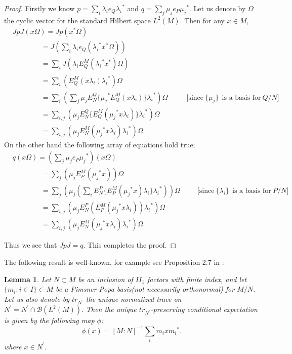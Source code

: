 \documentclass[11pt,letterpaper]{amsart}
\newtheorem{lemma}[theorem]{Lemma}
\theoremstyle{definition}
\theoremstyle{remark}
\begin{document}
 \begin{proof}
 Firstly we know $p=\sum_i{\lambda}_ie_Q{{\lambda}_i}^*$ and $q=\sum_j{\mu}_je_P{{\mu}_j}^*.$ Let us denote by $\Omega$ the cyclic vector for  the standard Hilbert space $L^2(M).$ Then for any $x\in M$,
 \begin{align*}
  & JpJ(x\Omega)= Jp(x^*\Omega)\\
  & \qquad \qquad  = J(\sum_i{\lambda}_ie_Q({{\lambda}_i}^*x^*\Omega))\\
  & \qquad \qquad =\sum_i J({\lambda}_iE^M_Q({\lambda_i}^*x^*)\Omega)\\
  & \qquad \qquad = \sum_i(E^M_Q(x{\lambda}_i){{\lambda}_i}^*)\Omega\\
  & \qquad \qquad = \sum_i(\sum_j\mu_jE^Q_N\{{\mu_j}^*E^M_Q(x\lambda_i)\}{\lambda_i}^*)\Omega~~~~~~~~~~~~\textrm{[since}~\{\mu_j\}~~\textrm{is a basis for}~ Q/N]\\
  & \qquad \qquad = \sum_{i,j}(\mu_j E^Q_N\{E^M_Q({\mu_j}^*x{\lambda}_i)\}{\lambda_i}^*)\Omega\\
  &\qquad \qquad = \sum_{i,j}(\mu_jE^M_N({\mu_j}^*x{\lambda}_i){\lambda_i}^*)\Omega.
 \end{align*}
On the other hand the following array of equations hold true;
\begin{align*}
& q(x\Omega) = (\sum_j{\mu}_je_P{{\mu}_j}^*)(x\Omega)\\
&\qquad \qquad = \sum_j (\mu_j E^M_P({\mu_j}^*x))\Omega\\
& \qquad \qquad = \sum_j (\mu_j(\sum_i E^P_N\{E^M_P({\mu_j}^*x)\lambda_i\}{\lambda_i}^*))\Omega ~~~~~~~~~~~\textrm{[since}~\{\lambda_i\}~~\textrm{is a basis for}~ P/N]\\
& \qquad \qquad = \sum_{i,j}(\mu_j E^P_N(E^M_P({\mu_j}^*x\lambda_i)){\lambda_i}^*)\Omega\\
  &\qquad \qquad = \sum_{i,j}(\mu_jE^M_N({\mu_j}^*x{\lambda}_i){\lambda_i}^*)\Omega.
\end{align*}


Thus we see that $JpJ=q$. This completes the proof.
\end{proof}


The following result is well-known, for example see Proposition 2.7 in \cite{Bi2}:\begin{lemma}\label{ocneanu}
 Let $N\subset M$ be an inclusion of $II_1$ factors with finite index, and let $\{m_i:i\in I\} \subset M$ be a Pimsner-Popa basis(not necessarily orthonormal)
 for $M/N$. Let us also  denote by $tr_{N^{\prime}}$  the unique normalized trace on $N^{\prime}=N^{\prime}\cap \mathcal{B}(L^2(M)).$ Then the unique $tr_{N^{\prime}}$-preserving conditional expectation is given by the following map $\phi$:
 $$\phi(x)={[M:N]}^{-1}\sum_im_ix{m_i}^*.$$
where $x\in N^{\prime}.$
\end{lemma}
\end{document}
